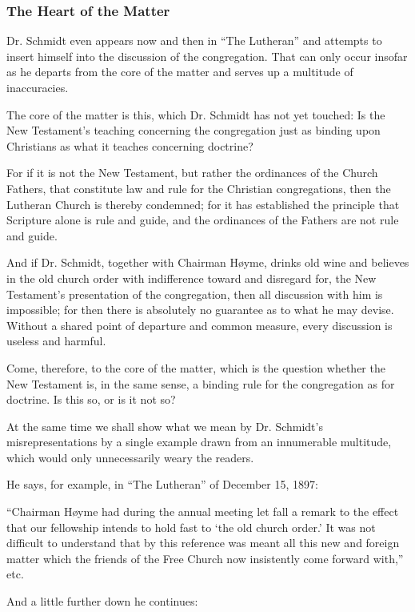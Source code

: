 \subsubsection{The Heart of the Matter}


Dr. Schmidt even appears now and then in “The Lutheran” and attempts to insert himself into the discussion of the congregation. That can only occur insofar as he departs from the core of the matter and serves up a multitude of inaccuracies.

The core of the matter is this, which Dr. Schmidt has not yet touched:
Is the New Testament’s teaching concerning the congregation just as binding upon Christians as what it teaches concerning doctrine?

For if it is not the New Testament, but rather the ordinances of the Church Fathers, that constitute law and rule for the Christian congregations, then the Lutheran Church is thereby condemned; for it has established the principle that Scripture alone is rule and guide, and the ordinances of the Fathers are not rule and guide.

And if Dr. Schmidt, together with Chairman Høyme, drinks old wine and believes in the old church order with indifference toward and disregard for, the New Testament’s presentation of the congregation, then all discussion with him is impossible; for then there is absolutely no guarantee as to what he may devise. Without a shared point of departure and common measure, every discussion is useless and harmful.

Come, therefore, to the core of the matter, which is the question whether the New Testament is, in the same sense, a binding rule for the congregation as for doctrine. Is this so, or is it not so?

At the same time we shall show what we mean by Dr. Schmidt’s misrepresentations by a single example drawn from an innumerable multitude, which would only unnecessarily weary the readers.

He says, for example, in “The Lutheran” of December 15, 1897:

“Chairman Høyme had during the annual meeting let fall a remark to the effect that our fellowship intends to hold fast to ‘the old church order.’ It was not difficult to understand that by this reference was meant all this new and foreign matter which the friends of the Free Church now insistently come forward with,” etc.

And a little further down he continues:

